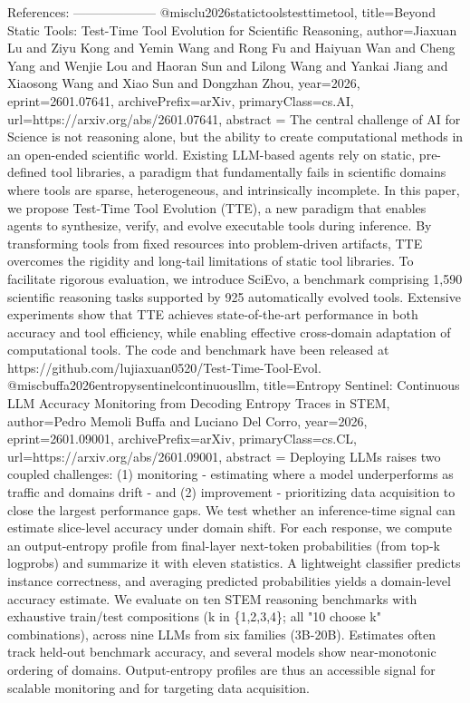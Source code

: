         References:
        --------------------
        @misc{lu2026statictoolstesttimetool,
      title={Beyond Static Tools: Test-Time Tool Evolution for Scientific Reasoning}, 
      author={Jiaxuan Lu and Ziyu Kong and Yemin Wang and Rong Fu and Haiyuan Wan and Cheng Yang and Wenjie Lou and Haoran Sun and Lilong Wang and Yankai Jiang and Xiaosong Wang and Xiao Sun and Dongzhan Zhou},
      year={2026},
      eprint={2601.07641},
      archivePrefix={arXiv},
      primaryClass={cs.AI},
      url={https://arxiv.org/abs/2601.07641},
      abstract = {The central challenge of AI for Science is not reasoning alone, but the ability to create computational methods in an open-ended scientific world. Existing LLM-based agents rely on static, pre-defined tool libraries, a paradigm that fundamentally fails in scientific domains where tools are sparse, heterogeneous, and intrinsically incomplete. In this paper, we propose Test-Time Tool Evolution (TTE), a new paradigm that enables agents to synthesize, verify, and evolve executable tools during inference. By transforming tools from fixed resources into problem-driven artifacts, TTE overcomes the rigidity and long-tail limitations of static tool libraries. To facilitate rigorous evaluation, we introduce SciEvo, a benchmark comprising 1,590 scientific reasoning tasks supported by 925 automatically evolved tools. Extensive experiments show that TTE achieves state-of-the-art performance in both accuracy and tool efficiency, while enabling effective cross-domain adaptation of computational tools. The code and benchmark have been released at https://github.com/lujiaxuan0520/Test-Time-Tool-Evol.}
}@misc{buffa2026entropysentinelcontinuousllm,
      title={Entropy Sentinel: Continuous LLM Accuracy Monitoring from Decoding Entropy Traces in STEM}, 
      author={Pedro Memoli Buffa and Luciano Del Corro},
      year={2026},
      eprint={2601.09001},
      archivePrefix={arXiv},
      primaryClass={cs.CL},
      url={https://arxiv.org/abs/2601.09001},
      abstract = {Deploying LLMs raises two coupled challenges: (1) monitoring - estimating where a model underperforms as traffic and domains drift - and (2) improvement - prioritizing data acquisition to close the largest performance gaps. We test whether an inference-time signal can estimate slice-level accuracy under domain shift. For each response, we compute an output-entropy profile from final-layer next-token probabilities (from top-k logprobs) and summarize it with eleven statistics. A lightweight classifier predicts instance correctness, and averaging predicted probabilities yields a domain-level accuracy estimate. We evaluate on ten STEM reasoning benchmarks with exhaustive train/test compositions (k in \{1,2,3,4\}; all "10 choose k" combinations), across nine LLMs from six families (3B-20B). Estimates often track held-out benchmark accuracy, and several models show near-monotonic ordering of domains. Output-entropy profiles are thus an accessible signal for scalable monitoring and for targeting data acquisition.}
}
